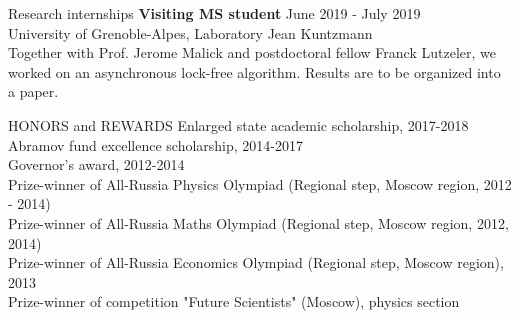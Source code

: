 \documentclass{resume} %
\begin{document}
\begin{rSection}{Research internships}
{\bf Visiting MS student } \hfill June 2019 - July 2019 \\
University of Grenoble-Alpes, Laboratory Jean Kuntzmann\\
Together with Prof. Jerome Malick and postdoctoral fellow Franck Lutzeler, we worked on an asynchronous lock-free algorithm. Results are to be organized into a paper.
\end{rSection}





\begin{rSection}{HONORS and REWARDS}
{Enlarged state academic scholarship, 2017-2018}\\
{Abramov fund excellence scholarship, 2014-2017}\\
{Governor’s award, 2012-2014}\\
{Prize-winner of All-Russia Physics Olympiad (Regional step, Moscow region, 2012 - 2014)}\\
{Prize-winner of All-Russia Maths Olympiad (Regional step, Moscow region, 2012, 2014)}\\
{Prize-winner of All-Russia Economics Olympiad (Regional step, Moscow region), 2013}\\
{Prize-winner of competition "Future Scientists" (Moscow), physics section}

\end{rSection}

\end{document}
